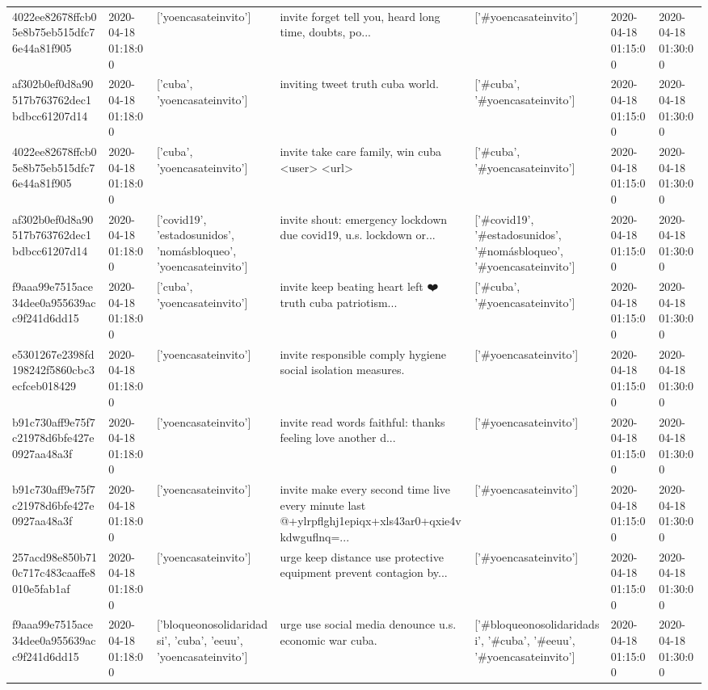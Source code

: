\begin{tabular}{lllllll}
4022ee82678ffcb05e8b75eb515dfc76e44a81f905 & 2020-04-18 01:18:00 & ['yoencasateinvito'] & invite forget tell you, heard long time, doubts, po... & ['#yoencasateinvito'] & 2020-04-18 01:15:00 & 2020-04-18 01:30:00 \\
af302b0ef0d8a90517b763762dec1bdbcc61207d14 & 2020-04-18 01:18:00 & ['cuba', 'yoencasateinvito'] & inviting tweet truth cuba world. & ['#cuba', '#yoencasateinvito'] & 2020-04-18 01:15:00 & 2020-04-18 01:30:00 \\
4022ee82678ffcb05e8b75eb515dfc76e44a81f905 & 2020-04-18 01:18:00 & ['cuba', 'yoencasateinvito'] & invite take care family, win cuba <user> <url> & ['#cuba', '#yoencasateinvito'] & 2020-04-18 01:15:00 & 2020-04-18 01:30:00 \\
af302b0ef0d8a90517b763762dec1bdbcc61207d14 & 2020-04-18 01:18:00 & ['covid19', 'estadosunidos', 'nomásbloqueo', 'yoencasateinvito'] & invite shout: emergency lockdown due covid19, u.s. lockdown or... & ['#covid19', '#estadosunidos', '#nomásbloqueo', '#yoencasateinvito'] & 2020-04-18 01:15:00 & 2020-04-18 01:30:00 \\
f9aaa99e7515ace34dee0a955639acc9f241d6dd15 & 2020-04-18 01:18:00 & ['cuba', 'yoencasateinvito'] & invite keep beating heart left ❤️ truth cuba patriotism... & ['#cuba', '#yoencasateinvito'] & 2020-04-18 01:15:00 & 2020-04-18 01:30:00 \\
e5301267e2398fd198242f5860cbc3ecfceb018429 & 2020-04-18 01:18:00 & ['yoencasateinvito'] & invite responsible comply hygiene social isolation measures. & ['#yoencasateinvito'] & 2020-04-18 01:15:00 & 2020-04-18 01:30:00 \\
b91c730aff9e75f7c21978d6bfe427e0927aa48a3f & 2020-04-18 01:18:00 & ['yoencasateinvito'] & invite read words faithful: thanks feeling love another d... & ['#yoencasateinvito'] & 2020-04-18 01:15:00 & 2020-04-18 01:30:00 \\
b91c730aff9e75f7c21978d6bfe427e0927aa48a3f & 2020-04-18 01:18:00 & ['yoencasateinvito'] & invite make every second time live every minute last @+ylrpflghj1epiqx+xls43ar0+qxie4vkdwguflnq=... & ['#yoencasateinvito'] & 2020-04-18 01:15:00 & 2020-04-18 01:30:00 \\
257acd98e850b710c717c483caaffe8010e5fab1af & 2020-04-18 01:18:00 & ['yoencasateinvito'] & urge keep distance use protective equipment prevent contagion by... & ['#yoencasateinvito'] & 2020-04-18 01:15:00 & 2020-04-18 01:30:00 \\
f9aaa99e7515ace34dee0a955639acc9f241d6dd15 & 2020-04-18 01:18:00 & ['bloqueonosolidaridadsi', 'cuba', 'eeuu', 'yoencasateinvito'] & urge use social media denounce u.s. economic war cuba. & ['#bloqueonosolidaridadsi', '#cuba', '#eeuu', '#yoencasateinvito'] & 2020-04-18 01:15:00 & 2020-04-18 01:30:00 \\

\end{tabular}
